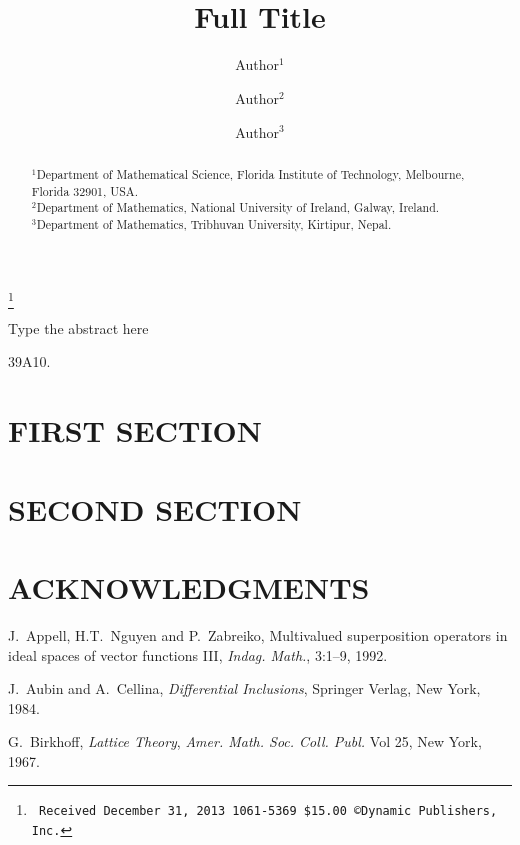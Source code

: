 \documentclass[12pt]{dsa}
\theoremstyle{plain}
\theoremstyle{definition}
\numberwithin{equation}{section}
\begin{document}
\newcommand{\T}{\mathbb{T}}
\newcommand{\R}{\mathbb{R}}
\newcommand{\Q}{\mathbb{Q}}
\newcommand{\N}{\mathbb{N}}
\newcommand{\Z}{\mathbb{Z}}
\newcommand{\tx}[1]{\quad\mbox{#1}\quad}


\title[Short Title]{\mbox{}\\[1cm]Full Title}
\author{Author$^1$}
\author{Author$^2$}
\author{Author$^3$}
\begin{abstract}
\vspace{-.2cm} 
\begin{center}
$^1$Department of Mathematical Science, Florida Institute of Technology, Melbourne, Florida 32901, USA.\\
$^2$Department of Mathematics, National University of Ireland, Galway, Ireland. \\
$^3$Department of Mathematics, Tribhuvan University, 
Kirtipur, Nepal.
\end{center}
\vspace{-.2cm}
\end{abstract}
\thanks{\hspace{-.5cm}\tt
	Received December 31, 2013
	\hfill 1061-5369 \$15.00 \copyright Dynamic Publishers, Inc.}
\maketitle
\thispagestyle{empty}

{\footnotesize
{} Type the abstract here

 39A10.
}

\section{FIRST SECTION}\label{s1}

\section{SECOND SECTION}\label{s2}

\section*{ACKNOWLEDGMENTS}

\begin{thebibliography}{9}

 J.~Appell, H.T.~Nguyen and P.~Zabreiko, Multivalued superposition operators in ideal spaces of vector functions III, {\em Indag. Math.}, 3:1--9, 1992.

 J.~Aubin and A.~Cellina, \emph{Differential Inclusions}, Springer Verlag,
New York, 1984.

 G.~Birkhoff, \emph{Lattice Theory}, {\em Amer. Math. Soc. Coll. Publ.} Vol 25, New York, 1967.

 
\end{thebibliography}
\end{document}
